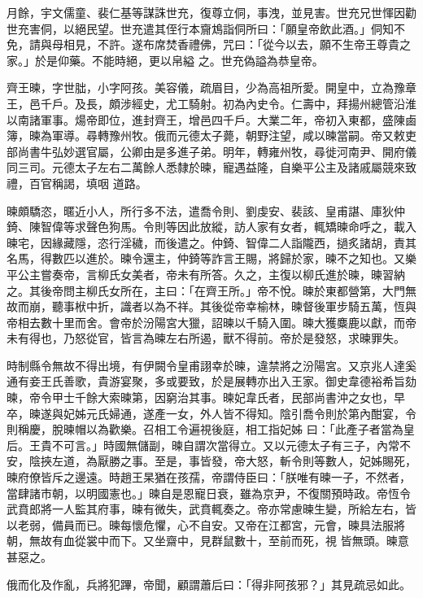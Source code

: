 \begin{pinyinscope}
 月餘，宇文儒童、裴仁基等謀誅世充，復尊立侗，事洩，並見害。世充兄世惲因勸世充害侗，以絕民望。世充遣其侄行本齎鴆詣侗所曰：「願皇帝飲此酒。」侗知不免，請與母相見，不許。遂布席焚香禮佛，咒曰：「從今以去，願不生帝王尊貴之家。」於是仰藥。不能時絕，更以帛縊
 之。世充偽謚為恭皇帝。



 齊王暕，字世朏，小字阿孩。美容儀，疏眉目，少為高祖所愛。開皇中，立為豫章王，邑千戶。及長，頗涉經史，尤工騎射。初為內史令。仁壽中，拜揚州總管沿淮以南諸軍事。煬帝即位，進封齊王，增邑四千戶。大業二年，帝初入東都，盛陳鹵簿，暕為軍導。尋轉豫州牧。俄而元德太子薨，朝野注望，咸以暕當嗣。帝又敕吏部尚書牛弘妙選官屬，公卿由是多進子弟。明年，轉雍州牧，尋徙河南尹、開府儀同三司。元德太子左右二萬餘人悉隸於暕，寵遇益隆，自樂平公主及諸戚屬競來致禮，百官稱謁，填咽
 道路。



 暕頗驕恣，暱近小人，所行多不法，遣喬令則、劉虔安、裴該、皇甫諶、庫狄仲錡、陳智偉等求聲色狗馬。令則等因此放縱，訪人家有女者，輒矯暕命呼之，載入暕宅，因緣藏隱，恣行淫穢，而後遣之。仲錡、智偉二人詣隴西，撾炙諸胡，責其名馬，得數匹以進於。暕令還主，仲錡等詐言王賜，將歸於家，暕不之知也。又樂平公主嘗奏帝，言柳氏女美者，帝未有所答。久之，主復以柳氏進於暕，暕習納之。其後帝問主柳氏女所在，主曰：「在齊王所。」帝不悅。暕於東都營第，大門無故而崩，聽事栿中折，識者以為不祥。其後從帝幸榆林，暕督後軍步騎五萬，恆與
 帝相去數十里而舍。會帝於汾陽宮大獵，詔暕以千騎入圍。暕大獲麋鹿以獻，而帝未有得也，乃怒從官，皆言為暕左右所遏，獸不得前。帝於是發怒，求暕罪失。



 時制縣令無故不得出境，有伊闕令皇甫詡幸於暕，違禁將之汾陽宮。又京兆人達奚通有妾王氏善歌，貴游宴聚，多或要致，於是展轉亦出入王家。御史韋德裕希旨劾暕，帝令甲士千餘大索暕第，因窮治其事。暕妃韋氏者，民部尚書沖之女也，早卒，暕遂與妃姊元氏婦通，遂產一女，外人皆不得知。陰引喬令則於第內酣宴，令則稱慶，脫暕帽以為歡樂。召相工令遍視後庭，相工指妃姊
 曰：「此產子者當為皇后。王貴不可言。」時國無儲副，暕自謂次當得立。又以元德太子有三子，內常不安，陰挾左道，為厭勝之事。至是，事皆發，帝大怒，斬令則等數人，妃姊賜死，暕府僚皆斥之邊遠。時趙王杲猶在孩孺，帝謂侍臣曰：「朕唯有暕一子，不然者，當肆諸市朝，以明國憲也。」暕自是恩寵日衰，雖為京尹，不復關預時政。帝恆令武賁郎將一人監其府事，暕有微失，武賁輒奏之。帝亦常慮暕生變，所給左右，皆以老弱，備員而已。暕每懷危懼，心不自安。又帝在江都宮，元會，暕具法服將朝，無故有血從裳中而下。又坐齋中，見群鼠數十，至前而死，視
 皆無頭。暕意甚惡之。



 俄而化及作亂，兵將犯蹕，帝聞，顧謂蕭后曰：「得非阿孩邪？」其見疏忌如此。




\end{pinyinscope}
